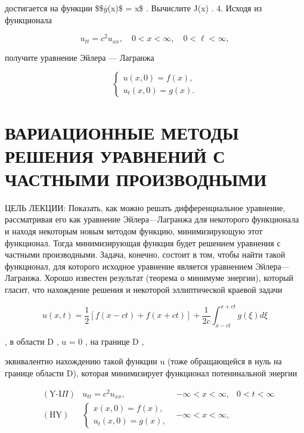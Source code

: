 \documentclass[
  ukrainian,
]{article}
\begin{document}
достигается на функции \$\$\(\overline{y}\)(x)\$ = \sin x\$ . Вычислите
J(\sin x) . 4. Исходя из функционала

\[
u_{tt} = c^2 u_{xx}, \quad 0 < x < \infty, \quad 0 < \ell < \infty,
\]

получите уравнение Эйлера --- Лагранжа

\[
\begin{cases} u(x, 0) = f(x), \\ u_t(x, 0) = g(x). \end{cases}
\]

\section{ВАРИАЦИОННЫЕ МЕТОДЫ РЕШЕНИЯ УРАВНЕНИЙ С ЧАСТНЫМИ
ПРОИЗВОДНЫМИ}\label{ux432ux430ux440ux438ux430ux446ux438ux43eux43dux43dux44bux435-ux43cux435ux442ux43eux434ux44b-ux440ux435ux448ux435ux43dux438ux44f-ux443ux440ux430ux432ux43dux435ux43dux438ux439-ux441-ux447ux430ux441ux442ux43dux44bux43cux438-ux43fux440ux43eux438ux437ux432ux43eux434ux43dux44bux43cux438}

ЦЕЛЬ ЛЕКЦИИ: Показать, как можно решать дифференциальное уравнение,
рассматривая его как уравнение Эйлера---Лагранжа для некоторого
функционала и находя некоторым новым методом функцию, минимизирующую
этот функционал. Тогда минимизирующая функция будет решением уравнения с
частными производными. Задача, конечно, состоит в том, чтобы найти такой
функционал, для которого исходное уравнение является уравнением
Эйлера---Лагранжа. Хорошо известен результат (теорема о минимуме
энергии), который гласит, что нахождение решения и некоторой
эллиптической краевой задачи

\[
u(x, t) = \frac{1}{2} [f(x-ct) + f(x+ct)] + \frac{1}{2c} \int_{x-ct}^{x+ct} g(\xi) d\xi
\]

, в области D , u = 0 , на границе D ,

эквивалентно нахождению такой функции u (тоже обращающейся в нуль на
границе области D), которая минимизирует функционал потенинальной
энергии

\[
\begin{aligned} & (\text{Y-I}\Pi) & u_{tt} = c^2 u_{xx}, & -\infty < x < \infty, & 0 < t < \infty \\ & (\text{HY}) & \begin{cases} x(x, 0) = f(x), \\ u_t(x, 0) = g(x), \end{cases} & -\infty < x < \infty, \end{aligned}
\]
\end{document}
